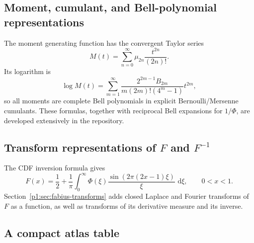 \documentclass[11pt]{article}
\theoremstyle{definition}
\theoremstyle{remark}
\newcommand{\dd}{\,\mathrm d}
\begin{document}
\subsection{Moment, cumulant, and Bell-polynomial representations}

The moment generating function has the convergent Taylor series
\begin{equation}
 M(t)=\sum_{n=0}^{\infty}\mu_{2n}\frac{t^{2n}}{(2n)!}.       \label{p1:eq:M-moment-series}
\end{equation}
Its logarithm is
\begin{equation}
 \log M(t)=
 \sum_{m=1}^{\infty}
 \frac{2^{2m-1}B_{2m}}{m(2m)!(4^m-1)}t^{2m},                \label{p1:eq:M-cumulant}
\end{equation}
so all moments are complete Bell polynomials in explicit Bernoulli/Mersenne cumulants.
These formulas, together with reciprocal Bell expansions for \(1/\Phi\), are developed
extensively in the repository.

\subsection{Transform representations of \(F\) and \(F^{-1}\)}

The CDF inversion formula gives
\begin{equation}
 F(x)=\frac12+\frac1\pi\int_0^{\infty}
 \Phi(\xi)\frac{\sin(2\pi(2x-1)\xi)}{\xi}\,\dd\xi,
 \qquad 0<x<1.                                               \label{p1:eq:F-CDF-Fourier}
\end{equation}
Section~\ref{p1:sec:fabius-transforms} adds closed Laplace and Fourier transforms of \(F\) as
a function, as well as transforms of its derivative measure and its inverse.

\subsection{A compact atlas table}
\end{document}

